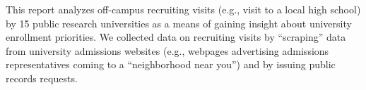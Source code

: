 \documentclass[twoside]{article}
\begin{document}

This report analyzes off-campus recruiting visits (e.g., visit to a local high school) by 15 public research universities as a means of gaining insight about university enrollment priorities. We collected data on recruiting visits by “scraping” data from university admissions websites (e.g., webpages advertising admissions representatives coming to a ``neighborhood near you'') and by issuing public records requests. 
\end{document}
